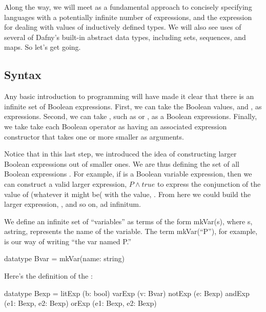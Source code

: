 \documentclass[letterpaper,10pt,english]{sphinxmanual}
\begin{document}
Along the way, we will meet  as a fundamental
approach to concisely specifying languages with a potentially infinite
number of expressions, and the  expression for dealing with
values of inductively defined types. We will also see uses of several
of Dafny’s built-in abstract data types, including sets, sequences,
and maps. So let’s get going.


\subsection{Syntax}
\label{\detokenize{11-propositional-logic:id4}}
Any basic introduction to programming will have made it clear that
there is an infinite set of Boolean expressions. First, we can take
the Boolean values,  and , as  expressions.
Second, we can take , such as  or , as a
Boolean  expressions. Finally, we take take each Boolean
operator as having an associated expression constructor that takes one
or more smaller  as arguments.

Notice that in this last step, we introduced the idea of constructing
larger Boolean expressions out of smaller ones. We are thus defining
the set of all Boolean expressions . For example, if 
is a Boolean variable expression, then we can construct a valid larger
expression, \(P \land true\) to express the conjunction of the
value of  (whatever it might be( with the value, . From here
we could build the larger expression, , and so
on, ad infinitum.

We define an infinite set of “variables” as terms of the form
mkVar(s), where s, astring, represents the name of the variable. The
term mkVar(“P”), for example, is our way of writing “the var named P.”

\begin{sphinxVerbatim}[commandchars=\\\{\}]
datatype Bvar = mkVar(name: string)
\end{sphinxVerbatim}

Here’s the definition of the :

\begin{sphinxVerbatim}[commandchars=\\\{\}]
datatype Bexp =
    litExp (b: bool) \textbar{}
    varExp (v: Bvar) \textbar{}
    notExp (e: Bexp) \textbar{}
    andExp (e1: Bexp, e2: Bexp) \textbar{}
    orExp (e1: Bexp, e2: Bexp)
\end{sphinxVerbatim}
\end{document}
